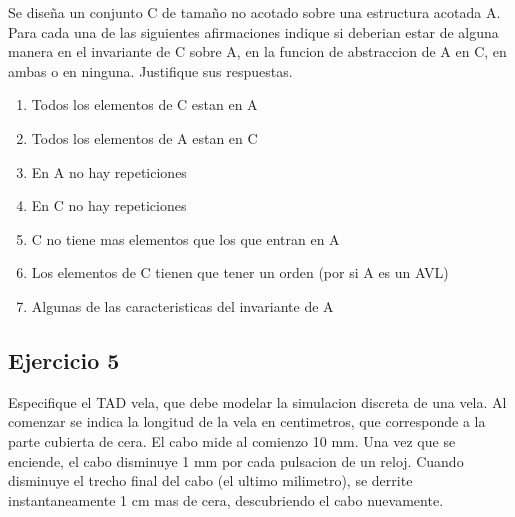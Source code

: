 \documentclass[10pt, a4paper]{report}
\begin{document}
Se dise\~na un conjunto C de tama\~no no acotado sobre una estructura acotada A. Para cada una de las siguientes afirmaciones indique si deberian estar de alguna manera en el invariante de C sobre A, en la funcion de abstraccion de A en C, en ambas o en ninguna. Justifique sus respuestas.

\begin{enumerate}
 \item Todos los elementos de C estan en A
 \item Todos los elementos de A estan en C
 \item En A no hay repeticiones
 \item En C no hay repeticiones
 \item C no tiene mas elementos que los que entran en A
 \item Los elementos de C tienen que tener un orden (por si A es un AVL)
 \item Algunas de las caracteristicas del invariante de A
\end{enumerate}

\subsection*{Ejercicio 5}

Especifique el TAD vela, que debe modelar la simulacion discreta de una vela. Al comenzar se indica la longitud de la vela en centimetros, que corresponde a la parte cubierta de cera. El cabo mide al comienzo 10 mm. Una vez que se enciende, el cabo disminuye 1 mm por cada pulsacion de un reloj. Cuando disminuye el trecho final del cabo (el ultimo milimetro), se derrite instantaneamente 1 cm mas de cera, descubriendo el cabo nuevamente.
\end{document}
